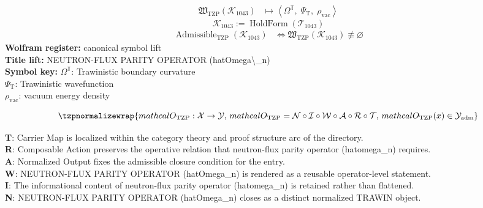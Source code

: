 \noindent
\begin{minipage}[t]{0.48\linewidth}
\begingroup
\small
\[
\begin{aligned}
\mathfrak{W}_{\mathrm{TZP}}\!\left(\mathcal{K}_{1043}\right)
&\longmapsto
\left\langle \Omega^{\mathbb{T}},\; \Psi_{\mathrm{T}},\; \rho_{\mathrm{vac}} \right\rangle
\end{aligned}
\]
\[
\mathcal{K}_{1043}
:=
\operatorname{HoldForm}\!\left(\mathcal{T}_{1043}\right)
\]
\[
\begin{aligned}
\operatorname{Admissible}_{\mathrm{TZP}}\!\left(\mathcal{K}_{1043}\right)
&\Longleftrightarrow
\mathfrak{W}_{\mathrm{TZP}}\!\left(\mathcal{K}_{1043}\right)\not\equiv\varnothing
\end{aligned}
\]
\textbf{Wolfram register:} canonical symbol lift\\
\textbf{Title lift:} NEUTRON-FLUX PARITY OPERATOR (hatOmega\textbackslash{}\_n)\\
\textbf{Symbol key:} \(\Omega^{\mathbb{T}}\): Trawinistic boundary curvature\\ \(\Psi_{\mathrm{T}}\): Trawinistic wavefunction\\ \(\rho_{\mathrm{vac}}\): vacuum energy density
\par
\endgroup
\end{minipage}\hfill
\begin{minipage}[t]{0.48\linewidth}
\[
\tzpnormalizewrap{mathcal{O}_{\mathrm{TZP}} : \mathcal{X} \to \mathcal{Y},\,mathcal{O}_{\mathrm{TZP}} = \mathcal{N}\circ \mathcal{I}\circ \mathcal{W}\circ \mathcal{A}\circ \mathcal{R}\circ \mathcal{T},\,mathcal{O}_{\mathrm{TZP}}(x) \in \mathcal{Y}_{\mathrm{adm}}}
\]

\small
\textbf{T}: Carrier Map is localized within the category theory and proof structure arc of the directory.\\
\textbf{R}: Composable Action preserves the operative relation that neutron-flux parity operator (hatomega\_n) requires.\\
\textbf{A}: Normalized Output fixes the admissible closure condition for the entry.\\
\textbf{W}: NEUTRON-FLUX PARITY OPERATOR (hatOmega\_n) is rendered as a reusable operator-level statement.\\
\textbf{I}: The informational content of neutron-flux parity operator (hatomega\_n) is retained rather than flattened.\\
\textbf{N}: NEUTRON-FLUX PARITY OPERATOR (hatOmega\_n) closes as a distinct normalized TRAWIN object.
\normalsize
\end{minipage}

